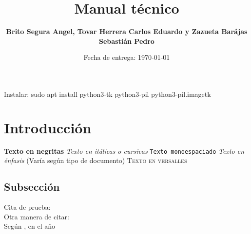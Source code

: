 \documentclass[letterpaper,10.5pt]{article} %
\title{Manual técnico}
\author{\textbf{Brito Segura Angel, Tovar Herrera Carlos Eduardo y Zazueta Barájas Sebastián Pedro}}
\date{Fecha de entrega: \today}
\begin{document}
    \pagestyle{fancy} %
    \maketitle %
    
    Instalar: sudo apt install python3-tk python3-pil python3-pil.imagetk

    \section{Introducción}
	    \textbf{Texto en negritas} \newline
		\textit{Texto en itálicas o cursivas} \newline
		\texttt{Texto monoespaciado} \newline
		\emph{Texto en énfasis} (Varía según tipo de documento) \newline
		\textsc{Texto en versalles} \newline

    \subsection{Subsección}
	    Cita de prueba: \cite{kim1995novel}\\ %

		Otra manera de citar: \citet{ipsum2010lorem}\\ %

		Según \citeauthor{ipsum2010lorem}, %
		en el año \citeyear{ipsum2010lorem}\\ %

	\hfill \break %

	
    
\end{document}
